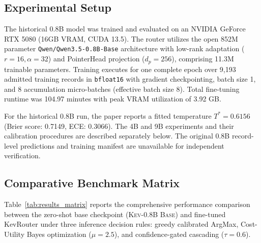 \documentclass[11pt,a4paper]{article}
\begin{document}
\subsection{Experimental Setup}
\label{subsec:exp_setup}

The historical 0.8B model was trained and evaluated on an NVIDIA GeForce RTX 5080 (16GB VRAM, CUDA 13.5). The router utilizes the open 852M parameter \texttt{Qwen/Qwen3.5-0.8B-Base} architecture with low-rank adaptation ($r=16, \alpha=32$) and PointerHead projection ($d_p=256$), comprising 11.3M trainable parameters. Training executes for one complete epoch over 9,193 admitted training records in \texttt{bfloat16} with gradient checkpointing, batch size 1, and 8 accumulation micro-batches (effective batch size 8). Total fine-tuning runtime was 104.97 minutes with peak VRAM utilization of 3.92 GB.

For the historical 0.8B run, the paper reports a fitted temperature $T^* = 0.6156$ (Brier score: 0.7149, ECE: 0.3066). The 4B and 9B experiments and their calibration procedures are described separately below. The original 0.8B record-level predictions and training manifest are unavailable for independent verification.

\subsection{Comparative Benchmark Matrix}
\label{subsec:benchmark_matrix}

Table~\ref{tab:results_matrix} reports the comprehensive performance comparison between the zero-shot base checkpoint (\textsc{Kev-0.8B Base}) and fine-tuned KevRouter under three inference decision rules: greedy calibrated ArgMax, Cost-Utility Bayes optimization ($\mu=2.5$), and confidence-gated cascading ($\tau=0.6$).
\end{document}
